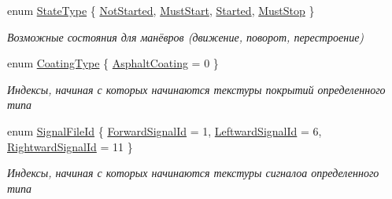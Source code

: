 \begin{DoxyCompactItemize}
\item 
enum \hyperlink{namespacertm_a11aeba1786456e9bc054ffe33b454181}{State\+Type} \{ \hyperlink{namespacertm_a11aeba1786456e9bc054ffe33b454181afd51c4cf7056147b72f22239887e6253}{Not\+Started}, 
\hyperlink{namespacertm_a11aeba1786456e9bc054ffe33b454181a96c2699f68e9fb747659d1c92e3e7e80}{Must\+Start}, 
\hyperlink{namespacertm_a11aeba1786456e9bc054ffe33b454181a4ee7fb1538d76d158c3b83cc86ac1823}{Started}, 
\hyperlink{namespacertm_a11aeba1786456e9bc054ffe33b454181af4b639b3d1f090ab120a66404d7874fc}{Must\+Stop}
 \}\begin{DoxyCompactList}\small\item\em Возможные состояния для манёвров (движение, поворот, перестроение) \end{DoxyCompactList}
\item 
enum \hyperlink{namespacertm_aecd3929e64cd461eb3555b611f6fad95}{Coating\+Type} \{ \hyperlink{namespacertm_aecd3929e64cd461eb3555b611f6fad95a1f8f9e610f75384989d155de714ce952}{Asphalt\+Coating} = 0
 \}\begin{DoxyCompactList}\small\item\em Индексы, начиная с которых начинаются текстуры покрытий определенного типа \end{DoxyCompactList}
\item 
enum \hyperlink{namespacertm_a4d86818f874975d3dc9f0f10feefc9c1}{Signal\+File\+Id} \{ \hyperlink{namespacertm_a4d86818f874975d3dc9f0f10feefc9c1a76558b4ee249fc454bbdb1d64d2fe0e9}{Forward\+Signal\+Id} = 1, 
\hyperlink{namespacertm_a4d86818f874975d3dc9f0f10feefc9c1aeff2fccef911bffb13ae08bc9f2dd926}{Leftward\+Signal\+Id} = 6, 
\hyperlink{namespacertm_a4d86818f874975d3dc9f0f10feefc9c1a9cbadfb5a62cec9d481f6525a51e5712}{Rightward\+Signal\+Id} = 11
 \}\begin{DoxyCompactList}\small\item\em Индексы, начиная с которых начинаются текстуры сигналоа определенного типа \end{DoxyCompactList}
\end{DoxyCompactItemize}
